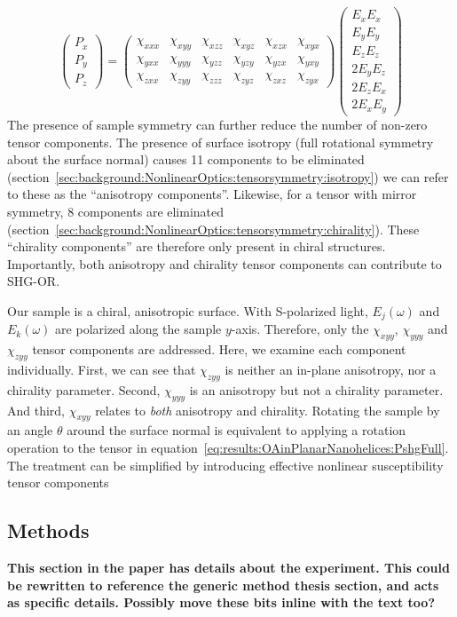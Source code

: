 \begin{equation}\label{eq:results:OAinPlanarNanohelices:PshgFull}
	\begin{pmatrix}
		P_{x}\\ 
		P_{y}\\ 
		P_{z}
	\end{pmatrix} =
	\begin{pmatrix}
		\chi_{xxx} & \chi_{xyy} & \chi_{xzz} & \chi_{xyz} & \chi_{xzx} & \chi_{xyx}\\ 
		\chi_{yxx} & \chi_{yyy} & \chi_{yzz} & \chi_{yzy} & \chi_{yzx} & \chi_{yxy}\\ 
		\chi_{zxx} & \chi_{zyy} & \chi_{zzz} & \chi_{zyz} & \chi_{zxz} & \chi_{zyx}
	\end{pmatrix}
	\begin{pmatrix}
		E_{x}E_{x}\\ 
		E_{y}E_{y}\\ 
		E_{z}E_{z}\\
		2E_{y}E_{z}\\ 
		2E_{z}E_{x}\\ 
		2E_{x}E_{y}
	\end{pmatrix}
\end{equation}
The presence of sample symmetry can further reduce the number of non-zero tensor components. The presence of surface isotropy (full rotational symmetry about the surface normal) causes 11 components to be eliminated (section~\ref{sec:background:NonlinearOptics:tensorsymmetry:isotropy}) we can refer to these as the ``anisotropy components''. Likewise, for a tensor with mirror symmetry, 8 components are eliminated  (section~\ref{sec:background:NonlinearOptics:tensorsymmetry:chirality}). These ``chirality components'' are therefore only present in chiral structures. Importantly, both anisotropy and chirality tensor components can contribute to SHG-OR. 

Our sample is a chiral, anisotropic surface. With S-polarized light, ${E_j}(\omega)$ and ${E_k}(\omega)$ are polarized along the sample $y$-axis. Therefore, only the $\chi_{xyy}$, $\chi_{yyy}$ and $\chi_{zyy}$ tensor components are addressed. Here, we examine each component individually. 
First, we can see that $\chi_{zyy}$ is neither an in-plane anisotropy, nor a chirality parameter. Second, $\chi_{yyy}$ is an anisotropy but not a chirality parameter. And third, $\chi_{xyy}$ relates to \textit{both} anisotropy and chirality. 
Rotating the sample by an angle $\theta$ around the surface normal is equivalent to applying a rotation operation to the tensor in equation~\ref{eq:results:OAinPlanarNanohelices:PshgFull}. The treatment can be simplified by introducing effective nonlinear susceptibility tensor components


\subsection{Methods}\label{sec:results:OAinPlanarNanohelices:methods}
\textbf{This section in the paper has details about the experiment. This could be rewritten to reference the generic method thesis section, and acts as specific details. Possibly move these bits inline with the text too?}